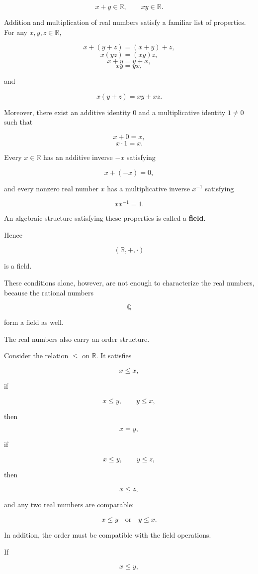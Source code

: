 \documentclass[11pt]{article}
\begin{document}
\[
x+y\in\mathbb{R},\qquad xy\in\mathbb{R}.
\]

Addition and multiplication of real numbers satisfy a familiar list of properties. For any $x,y,z\in\mathbb{R}$,

\[
x+(y+z)=(x+y)+z,
\]
\[
x(yz)=(xy)z,
\]
\[
x+y=y+x,
\]
\[
xy=yx,
\]

and

\[
x(y+z)=xy+xz.
\]

Moreover, there exist an additive identity $0$ and a multiplicative identity $1\ne0$ such that

\[
x+0=x,
\]
\[
x\cdot1=x.
\]

Every $x\in\mathbb{R}$ has an additive inverse $-x$ satisfying

\[
x+(-x)=0,
\]

and every nonzero real number $x$ has a multiplicative inverse $x^{-1}$ satisfying

\[
xx^{-1}=1.
\]

An algebraic structure satisfying these properties is called a \textbf{field}.

Hence

\[
(\mathbb{R},+,\cdot)
\]

is a field.

These conditions alone, however, are not enough to characterize the real numbers, because the rational numbers

\[
\mathbb{Q}
\]

form a field as well.

The real numbers also carry an order structure.

Consider the relation $\leq$ on $\mathbb{R}$. It satisfies

\[
x\leq x,
\]

if

\[
x\leq y,\qquad y\leq x,
\]

then

\[
x=y,
\]

if

\[
x\leq y,\qquad y\leq z,
\]

then

\[
x\leq z,
\]

and any two real numbers are comparable:

\[
x\leq y \quad\text{or}\quad y\leq x.
\]

In addition, the order must be compatible with the field operations.

If

\[
x\leq y,
\]
\end{document}
